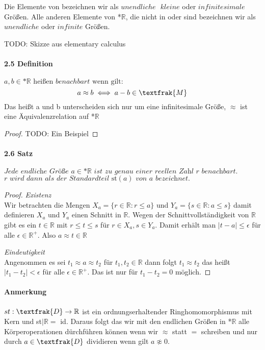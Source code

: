 \documentclass[a4paper]{article}
\begin{document}
Die Elemente von  bezeichnen wir als $ unendliche \text{ } kleine $ oder $ infinitesimale $ Größen. 
Alle anderen Elemente von *$\mathbb{R}$, die nicht in  oder  sind bezeichnen wir als $ unendliche $ oder $ infinite $ Größen.

\bigskip
TODO: Skizze aus elementary calculus 
\paragraph{2.5 Definition} $a,b \in \text{*}\mathbb{R} \text{ heißen } benachbart \text{ wenn gilt:} $
$$a \approx b \iff a - b \in \textfrak{M}$$
Das heißt a und b unterscheiden sich nur um eine infinitesimale Größe, $\approx$ ist eine Äquivalenzrelation auf *$\mathbb{R}$
\begin{proof}
      TODO: Ein Beispiel
\end{proof}

\paragraph{2.6 Satz} $ \textit{Jede endliche Größe } a \in \text{*}\mathbb{R} \textit{ ist zu genau einer reellen Zahl r benachbart.}$
$ \textit{r wird dann als der Standardteil } \text{st}(a) \textit{ von a bezeichnet.} $
\begin{proof}
      \textit{Existenz} \\
      Wir betrachten die Mengen $ X_a = \{r \in \mathbb{R}: r \leqslant a\} $ und  
      $ Y_a = \{s \in \mathbb{R}: a \leqslant s\} $ damit definieren $ X_a $ und $ Y_a $ einen Schnitt in $ \mathbb{R} $.
      Wegen der Schnittvollständigkeit von $ \mathbb{R} $ gibt es ein $ t \in \mathbb{R} $ mit $ r \leqslant t \leqslant s $ 
      für $ r \in X_a, s \in Y_a $. Damit erhält man $ |t - a| \leqslant \epsilon $ für alle $ \epsilon \in \mathbb{R}^+ $.
      Also $ a \approx t \in \mathbb{R} $

      \bigskip
      \textit{Eindeutigkeit} \\
      Angenommen es sei $ t_1 \approx a \approx t_2 $ für $ t_1, t_2 \in \mathbb{R} $ dann folgt $ t_1 \approx t_2 $ 
      das heißt $ |t_1 - t_2| < \epsilon $ für alle $ \epsilon \in \mathbb{R}^+ $. Das ist nur für $ t_1 - t_2 = 0 $ möglich.
\end{proof}

\paragraph{Anmerkung}
$st: \textfrak{D} \to \mathbb{R} $ ist ein ordnungserhaltender Ringhomomorphismus mit Kern 
und st$|\mathbb{R} =$ id. Daraus folgt das wir mit den endlichen Größen in *$\mathbb{R} $ alle Körperoperationen 
dürchführen können wenn wir $ \approx $ statt $ = $ schreiben und nur durch $ a \in \textfrak{D} $ dividieren 
wenn gilt $ a \not \approx 0 $.
\end{document}
